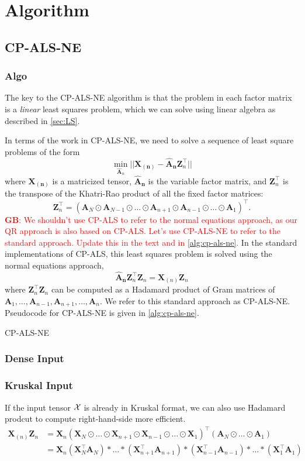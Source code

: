 \documentclass{article}
\newcommand{\mat}[1]{\mathbf{#1}}
\newcommand{\T}[2][]{#1{\mathbf{\cal{#2}}}} 						%
\newcommand{\GB}[1]{\textcolor{red}{\textbf{GB}: #1}}
\begin{document}
\section{Algorithm}
\subsection{CP-ALS-NE}
\subsubsection{Algo}


The key to the CP-ALS-NE algorithm is that the problem in each factor matrix is a \emph{linear} least squares problem, which we can solve using linear algebra as described in \cref{sec:LS}.

In terms of the work in CP-ALS-NE, we need to solve a sequence of least square problems of the form 
$$\min_{\mat{\hat{A}}_n}||\mat{X_{(n)}} - {\mat{\hat{A}_n}}\mat{Z}^\top_n ||$$
where $\mat{X_{(n)}}$ is a matricized tensor, $\mat{\hat{A}_n}$ is the variable factor matrix, and 
$\mat{Z}^\top_n$ is the transpose of the Khatri-Rao product of all the fixed factor matrices:
$$\mat{Z}^\top_n = (\mat{A}_N \odot \mat{A}_{N-1} \odot \dots \odot \mat{A}_{n+1} \odot \mat{A}_{n-1} \odot \dots \odot \mat{A}_1)^\top. $$ 
\GB{We shouldn't use CP-ALS to refer to the normal equations approach, as our QR approach is also based on CP-ALS.  Let's use CP-ALS-NE to refer to the standard approach.  Update this in the text and in \cref{alg:cp-als-ne}.}
In the standard implementations of CP-ALS, this least squares problem is solved using the normal equations approach,
$$\mat{\hat{A}_n}\mat{Z}_n^\top\mat{Z}_n = \mat{X}_{(n)}\mat{Z}_n$$
where $\mat{Z}_n^\top\mat{Z}_n$ can be computed as a Hadamard product of Gram matrices of $\mat{A}_{1}, \dots, \mat{A}_{n-1}, \mat{A}_{n+1}, \dots, \mat{A}_{n}$. 
We refer to this standard approach as CP-ALS-NE. Pseudocode for CP-ALS-NE is given in \cref{alg:cp-als-ne}.
\begin{algorithm}[!ht]
  \caption{CP-ALS-NE}
  \label{alg:cp-als-ne}
  
\end{algorithm}
\subsubsection{Dense Input}
\subsubsection{Kruskal Input}
If the input tensor $\T[]{X}$ is already in Kruskal format, we can also use Hadamard prodcut to compute right-hand-side more efficient.
\begin{align}
  \mat{X}_{(n)}\mat{Z}_n &= \mat{X}_n(\mat{X}_N \odot \dots \odot \mat{X}_{n+1} \odot \mat{X}_{n-1} \odot \dots \odot \mat{X}_1)^\top(\mat{A}_N \odot \dots \odot \mat{A}_1) \nonumber \\
 &= \mat{X}_n(\mat{X}_N^\top\mat{A}_N) \ast \dots \ast (\mat{X}_{n+1}^\top\mat{A}_{n+1}) \ast (\mat{X}_{n-1}^\top\mat{A}_{n-1}) \ast \dots \ast (\mat{X}_1^\top\mat{A}_1)  \nonumber 
\end{align}
\end{document}
